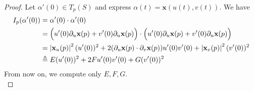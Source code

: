 \documentclass{report}
\begin{document}
\begin{proof}
Let $\alpha '(0)\in T_p(S)$ and express $\alpha (t)=\textbf{x}(u(t),v(t))$. We have 
\begin{align*}
I_p(\alpha '(0))&= \alpha '(0)\cdot \alpha '(0)\\
&= \Big( u'(0)\partial_u \textbf{x}(p)+ v'(0)\partial_u \textbf{x}(p) \Big) \cdot\Big( u'(0)\partial_u \textbf{x}(p)+ v'(0)\partial_u \textbf{x}(p) \Big)\\
&= \left|\textbf{x}_u(p)\right|^2 (u'(0))^2+ 2(\partial_u \textbf{x}(p)\cdot \partial_v \textbf{x}(p))u'(0)v'(0)+ \left|\textbf{x}_v(p)\right|^2 (v'(0))^2\\
&\triangleq E(u'(0))^2 +2Fu'(0)v'(0)+G(v'(0))^2
\end{align*}
From now on, we compute only $E,F,G$.\\



\end{proof}
\end{document}
